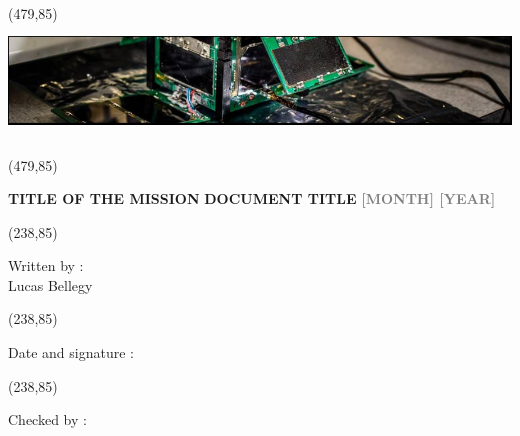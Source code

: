 \documentclass[12pt, a4paper, openright]{report}
\begin{document}
		
		\begin{center}
			\framebox(479,85){\includegraphics[height=85pt]{image1}}\\
			\vspace{0.3cm}
			
			\framebox(479,85){ \hfill\begin{minipage}[]{16.5cm}
					\hfill\textbf{TITLE OF THE MISSION}
					\hfill\flushright\large\textbf{\textcolor{bleuONE}{DOCUMENT TITLE}}
					\flushright \normalsize \textbf{\hfill \textcolor{gray}{[MONTH] [YEAR]}}
				\end{minipage} }
		\end{center}
		\framebox(238,85){\begin{minipage}[]{10cm}
				\begin{center}
					Written by :\\
					Lucas Bellegy\\
					\vspace{0.5cm}
					
				\end{center}
				
				
				
		\end{minipage}}
	\framebox(238,85){\begin{minipage}[]{10cm}
			\begin{center}
				Date and signature :\\
				\vspace{1cm}
			
			
		\end{center}
			
	\end{minipage}}
\noindent
	\framebox(238,85){\begin{minipage}[]{10cm}
			\begin{center}
				Checked  by :\\
				\vspace{0.5cm}
				
			\end{center}
			
			
			
	\end{minipage}}
\end{document}
